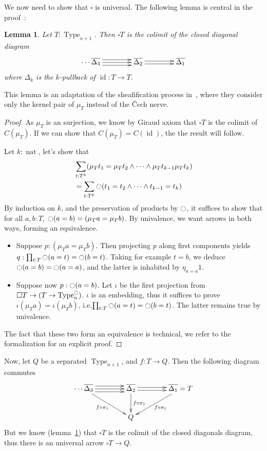\documentclass[conference]{IEEEtran}
\makeatletter
\newtheorem{lem}[thm]{Lemma}
\newcommand{\ie}{i.e,\xspace}
\def\dar[#1]#2{\ar@<-#2>[#1]\ar@<#2>[#1]} %
\def\tar[#1]#2{\ar@<#2>[#1]\ar@<0pt>[#1]\ar@<-#2>[#1]} %
\DeclareMathOperator{\Type}{Type}
\DeclareMathOperator{\nat}{nat}
\DeclareMathOperator{\id}{id}
\newcommand{\modal}{\ensuremath{\ocircle}}
\makeatother
\begin{document}
We now need to show that $\square$ is universal. The following
lemma is central in the proof~:
\begin{lem}\label{lem:sepiscolim}
  Let $T:\Type_{n+1}$. Then $\square T$ is the colimit of the closed
  diagonal diagram
  $$\xymatrix @C=4em  { 
    \cdots \overline{\Delta_3} \tar[r]{4pt} & \overline{\Delta_2} \dar[r]{2pt} &
    \overline{\Delta_1}
  }$$
where $\Delta_k$ is the $k$-pullback of $\id : T \to T$.
\end{lem}

This lemma is an adaptation of the sheafification process
in~\cite{maclanemoerdijk}, where they consider only the kernel pair of
$\mu_T$ instead of the \v{C}ech nerve.

\begin{proof}
  As $\mu_T$ is an surjection, we know by Giraud axiom that $\square T$ is the colimit
  of $C(\mu_T)$. If we can show that $C(\mu_T) = C(\id)$, the the
  result will follow. 

  Let $k:\nat$, let's show that 
  \begin{align*}
    &\sum_{t:T^k} (\mu_T t_1 = \mu_T t_2 \land \cdots
      \land \mu_T t_{k-1} \mu_T t_k)\\
    &= \sum_{t:T^k} \modal (t_1 = t_2 \land \cdots
      \land t_{k-1} = t_k)
  \end{align*}
By induction on $k$, and the preservation of products by $\modal$, it
suffices to show that for all $a,b:T$, $\modal (a=b) = (\mu_T a =
\mu_T b)$. By univalence, we want arrows in both ways, forming an
equivalence.
\begin{itemize}
\item Suppose $p : (\mu_T a = \mu_T b)$. Then projecting $p$ along
  first components yields $q : \prod_{t:T} \modal(a=t) = \modal (b=t)
  $.
  Taking for example $t=b$, we deduce $\modal (a=b) = \modal(a=a)$,
  and the latter is inhabited by $\eta_{a=a} 1$.
\item Suppose now $p : \modal(a=b)$. Let $\iota$ be the first
  projection from $\square T \to (T \to \Type_n^\modal)$. $\iota$ is
  an embedding, thus it suffices to prove $\iota (\mu_T a) = \iota
  (\mu_T b)$, \ie $\prod_{t:T}\modal (a=t) = \modal (b=t)$. The latter
  remains true by univalence.
\end{itemize}
The fact that these two form an equivalence is technical, we refer to
the formalization for an explicit proof.
\end{proof}

Now, let $Q$ be a separated $\Type_{n+1}$, and $f:T \to Q$. Then the
following diagram commutes
$$\xymatrix @C=4em{ 
    \cdots \overline{\Delta_3} \tar[r]{4pt} \ar[rd]_{f\circ \pi_1} & \overline{\Delta_2}
    \dar[r]{2pt} \ar[d]^{f\circ \pi_1} &
    \overline{\Delta_1} = T \ar[ld]^{f\circ \pi_1}\\
    & Q &
  }$$
But we know (lemma~\ref{lem:sepiscolim}) that $\square T$ is the
colimit of the closed diagonals diagram, thus there is an universal
arrow $\square T \to Q$.
\end{document}
